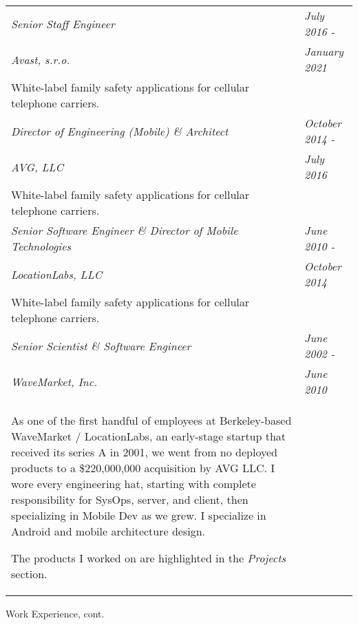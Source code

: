 \begin{tabular}{p{5.2in}@{\hspace{1.5cm}}l}

	\em Senior Staff Engineer	    & \em July 2016 -  \\
	\em  Avast, s.r.o. 	& \em January 2021 \\[4pt]
	
	   White-label family safety applications for cellular telephone carriers. \\[9pt]
	   
	\em Director of Engineering (Mobile)	 \& Architect & \em October 2014 -  \\
	\em  AVG, LLC 	& \em July 2016 \\[4pt]
	
	   White-label family safety applications for cellular telephone carriers. \\[9pt]
	   
	\em Senior Software Engineer \& Director of Mobile Technologies    & \em June 2010 -  \\
	\em  LocationLabs, LLC	& \em October 2014 \\[4pt]
	
	   White-label family safety applications for cellular telephone carriers. \\[9pt]
	   
	\em Senior Scientist \& Software Engineer    & \em June 2002 -  \\
	\em  WaveMarket, Inc. 	& \em June 2010 \\[4pt]
	
	   As one of the first handful of employees at Berkeley-based WaveMarket / LocationLabs,
	   an early-stage startup that received its series A in 2001, 
	   we went from no deployed products to a \$220,000,000
	   acquisition by AVG LLC.  I wore every engineering hat, starting with complete responsibility
	   for SysOps, server, and client, then specializing in Mobile Dev as we grew.  
	   I specialize in Android and mobile architecture design.
	   \smallskip

	   The products I worked on are highlighted in the {\em Projects} section. \\[9pt]

\end{tabular}

\newpage
\begin{bf} \large
Work Experience, cont.
\end{bf}
\medskip

